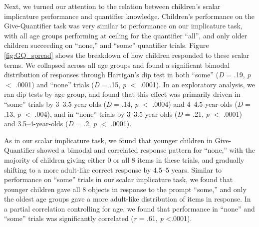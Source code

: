 \documentclass[man]{apa2}
\begin{document}
Next, we turned our attention to the relation between children's scalar implicature performance and quantifier knowledge. Children's performance on the Give-Quantifier task was very similar to performance on our implicature task, with all age groups performing at ceiling for the quantifier ``all'', and only older children succeeding on ``none,'' and ``some'' quantifier trials. Figure \ref{fig:GQ_spread} shows the breakdown of how children responded to these scalar terms. We collapsed across all age groups and found a significant bimodal distribution of responses through Hartigan's dip test in both ``some'' (\emph{D} = .19, \emph{p} $<$ .0001) and ``none'' trials (\emph{D} = .15, \emph{p} $<$ .0001). In an exploratory analysis, we ran dip tests by age group, and found that this effect was primarily driven in ``some'' trials by 3--3.5-year-olds (\emph{D} = .14, \emph{p} $<$ .0004) and 4--4.5-year-olds (\emph{D} = .13, \emph{p} $<$ .004), and in ``none'' trials by 3--3.5-year-olds (\emph{D} = .21, \emph{p} $<$ .0001) and 3.5--4-year-olds (\emph{D} = .2, \emph{p} $<$ .0001).

As in our scalar implicature task, we found that younger children in Give-Quantifier showed a bimodal and correlated response pattern for ``none,'' with the majority of children giving either 0 or all 8 items in these trials, and gradually shifting to a more adult-like correct response by 4.5--5 years. Similar to performance on ``some'' trials in our scalar implicature task, we found that younger children gave all 8 objects in response to the prompt ``some,'' and only the oldest age groups gave a more adult-like distribution of items in response. In a partial correlation controlling for age, we found that performance in ``none'' and ``some'' trials was significantly correlated (\textit{r} = .61, \textit{p} \textless .0001).
\end{document}
